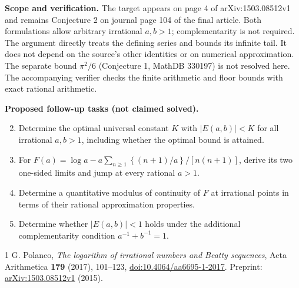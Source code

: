 \documentclass[11pt]{article}
\newcommand{\fr}[1]{\left\{#1\right\}}
\begin{document}
\noindent\textbf{Scope and verification.}
The target appears on page 4 of arXiv:1503.08512v1 and remains
Conjecture 2 on journal page 104 of the final article. Both formulations
allow arbitrary irrational $a,b>1$; complementarity is not required.
The argument directly treats the defining series and bounds its infinite
tail. It does not depend on the source's other identities or on numerical
approximation. The separate bound $\pi^2/6$ (Conjecture 1, MathDB 330197)
is not resolved here. The accompanying verifier checks the finite
arithmetic and floor bounds with exact rational arithmetic.

\medskip
\noindent\textbf{Proposed follow-up tasks (not claimed solved).}
\begin{enumerate}
\setcounter{enumi}{1}
\item Determine the optimal universal constant $K$ with $|E(a,b)|<K$
for all irrational $a,b>1$, including whether the optimal bound is attained.
\item For $F(a)=\log a-a\sum_{n\ge1}\fr{(n+1)/a}/[n(n+1)]$,
derive its two one-sided limits and jump at every rational $a>1$.
\item Determine a quantitative modulus of continuity of $F$ at irrational
points in terms of their rational approximation properties.
\item Determine whether $|E(a,b)|<1$ holds under the additional
complementarity condition $a^{-1}+b^{-1}=1$.
\end{enumerate}

\begin{thebibliography}{1}
 G. Polanco, \emph{The logarithm of irrational numbers
and Beatty sequences}, Acta Arithmetica \textbf{179} (2017), 101--123,
\href{https://doi.org/10.4064/aa6695-1-2017}{doi:10.4064/aa6695-1-2017}.
Preprint: \href{https://arxiv.org/abs/1503.08512}{arXiv:1503.08512v1} (2015).
\end{thebibliography}
\end{document}

